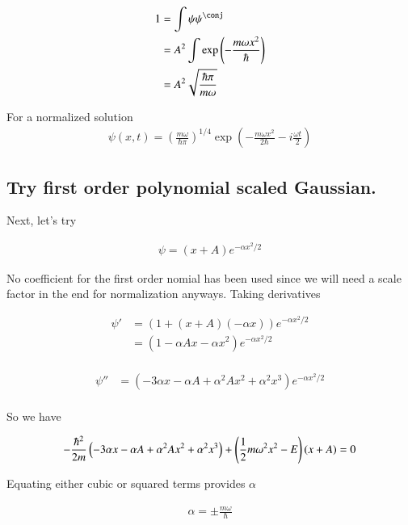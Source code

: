 \begin{align*}
1 
&= \int \psi \psi^\conj \\
&= A^2 \int \exp\left( - \frac{m \omega x^2 }{\hbar} \right) \\
&= A^2 \sqrt{ \frac{\hbar \pi}{ m \omega } }
\end{align*}

For a normalized solution
\begin{align}
\psi(x,t) = \left( 
\frac{ m \omega }{\hbar \pi}
\right)^{1/4} \exp\left( - \frac{m \omega x^2 }{2 \hbar} - i \frac{\omega t}{2} \right)
\end{align}

\subsection{Try first order polynomial scaled Gaussian. }

Next, let's try 

\begin{align*}
\psi = (x + A) e^{-\alpha x^2/2}
\end{align*}

No coefficient for the first order nomial has been used since we will need a scale factor in the end for normalization anyways.  Taking derivatives

\begin{align*}
\psi' 
&= (1 + (x + A)(-\alpha x)) e^{-\alpha x^2/2} \\
&= (1 - \alpha A x - \alpha x^2 ) e^{-\alpha x^2/2} \\
\end{align*}

\begin{align*}
\psi'' 
&= 
\left( - 3 \alpha x - \alpha A + \alpha^2 A x^2 + \alpha^2 x^3 \right) e^{-\alpha x^2/2} \\
\end{align*}

So we have

\begin{align*}
-\frac{\hbar^2}{2m}\left( - 3 \alpha x - \alpha A + \alpha^2 A x^2 + \alpha^2 x^3 \right) 
+ \left( \frac{1}{2}m \omega^2 x^2 - E \right) (x + A) = 0
\end{align*}

Equating either cubic or squared terms provides $\alpha$

\begin{align*}
\alpha = \pm \frac{m \omega}{\hbar}
\end{align*}

